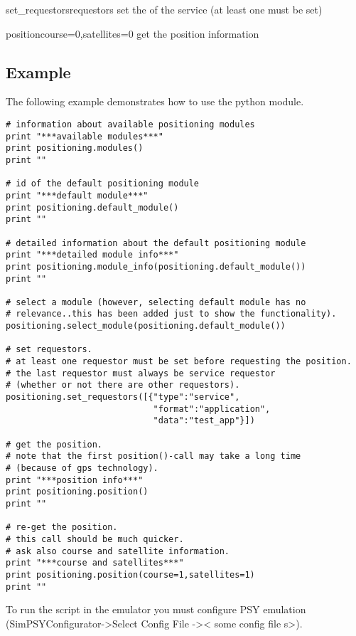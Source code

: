 \begin{funcdesc}{set_requestors}{requestors}
set the  of the service (at least one must be set)
\end{funcdesc}

\begin{funcdesc}{position}{course=0,satellites=0}
get the position information
\end{funcdesc}


\subsection{Example \label{position-example}}

The following example demonstrates how to use the python  module.

\begin{verbatim}
# information about available positioning modules
print "***available modules***"
print positioning.modules()
print ""

# id of the default positioning module
print "***default module***"
print positioning.default_module()
print ""

# detailed information about the default positioning module
print "***detailed module info***"
print positioning.module_info(positioning.default_module())
print ""

# select a module (however, selecting default module has no 
# relevance..this has been added just to show the functionality). 
positioning.select_module(positioning.default_module())

# set requestors.
# at least one requestor must be set before requesting the position.
# the last requestor must always be service requestor 
# (whether or not there are other requestors). 
positioning.set_requestors([{"type":"service",
                             "format":"application",
                             "data":"test_app"}])

# get the position. 
# note that the first position()-call may take a long time
# (because of gps technology).
print "***position info***"                         
print positioning.position()
print ""

# re-get the position.
# this call should be much quicker.
# ask also course and satellite information.
print "***course and satellites***" 
print positioning.position(course=1,satellites=1)
print ""
\end{verbatim}

To run the script in the emulator you must configure PSY emulation 
(SimPSYConfigurator-\textgreater Select Config File -\textgreater \textless 
some config file s\textgreater).
